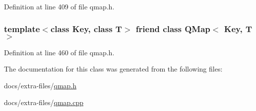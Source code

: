 Definition at line 409 of file qmap.\+h.

\subsubsection[{\texorpdfstring{Q\+Map$<$ Key, T $>$}{QMap< Key, T >}}]{\setlength{\rightskip}{0pt plus 5cm}template$<$class Key, class T$>$ friend class {\bf Q\+Map}$<$ Key, T $>$\hspace{0.3cm}{\ttfamily [friend]}}\hypertarget{class_q_map_1_1iterator_a6f07e70412dd8d995969c9e0cb5bc4a0}{}\label{class_q_map_1_1iterator_a6f07e70412dd8d995969c9e0cb5bc4a0}


Definition at line 460 of file qmap.\+h.



The documentation for this class was generated from the following files\+:\begin{DoxyCompactItemize}
\item 
docs/extra-\/files/\hyperlink{qmap_8h}{qmap.\+h}\item 
docs/extra-\/files/\hyperlink{qmap_8cpp}{qmap.\+cpp}\end{DoxyCompactItemize}
